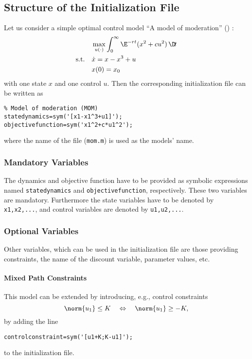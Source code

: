 \subsection{Structure of the Initialization File}
\label{sec:init_file}
Let us consider a simple optimal control model ``A model of moderation'' (\MOM) \citep{caulkinsetal2005a}:
\vspace{0.5cm}
\begin{subequations}
\label{eq:model_mom}
\begin{align}
& \max_{u(\cdot)}\int_0^\infty \E^{-rt}(x^2+cu^2)\,\D\!t\label{eq:model_mom_obj}\\
\text{s.t.}\quad & \dot{x} =x-x^3+u\label{eq:model_mom_dyn}\\
& x(0) = x_0\label{eq:model_mom_init}
\end{align}
\end{subequations}
\vspace{0.5cm}
with one state $x$ and one control $u$. Then the corresponding initialization file can be written as
\begin{lstlisting}
% Model of moderation (MOM) 
statedynamics=sym('[x1-x1^3+u1]');
objectivefunction=sym('x1^2+c*u1^2');
\end{lstlisting}
where the name of the file (\lstinline+mom.m+) is used as the models' name. 

\subsubsection{Mandatory Variables}
The dynamics and objective function have to be provided as symbolic expressions named \lstinline+statedynamics+ and \lstinline+objectivefunction+, respectively. These two variables are mandatory. Furthermore the state variables have to be denoted by \lstinline+x1,x2,...+, and control variables are denoted by \lstinline+u1,u2,...+.

\subsubsection{Optional Variables}
Other variables, which can be used in the initialization file are those providing constraints, the name of the discount variable, parameter values, etc.

\paragraph{Mixed Path Constraints}
This model can be extended by introducing, e.g., control constraints
\begin{displaymath}
  \norm{u_1}\leq K\quad\Leftrightarrow\quad \norm{u_1}\ge-K,
\end{displaymath}
by adding the line
\begin{lstlisting}
controlconstraint=sym('[u1+K;K-u1]');
\end{lstlisting}
to the initialization file. 

